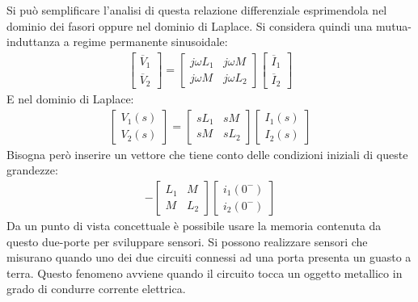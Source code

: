 \documentclass{article}
\numberwithin{equation}{subsection}
\begin{document}
Si può semplificare l'analisi di questa relazione differenziale esprimendola nel dominio dei fasori oppure nel dominio di Laplace. Si considera quindi una mutua-induttanza 
a regime permanente sinusoidale:
\begin{gather*}
    \begin{bmatrix}
        \overline{V}_1\\ \overline{V}_2
    \end{bmatrix}=\begin{bmatrix}
        j\omega L_1&j\omega M\\j\omega M&j\omega L_2
    \end{bmatrix}\begin{bmatrix}
        \overline{I}_1\\ \overline{I}_2
    \end{bmatrix}
\end{gather*}
E nel dominio di Laplace:
\begin{gather*}
    \begin{bmatrix}
        V_1(s)\\ V_2(s)
    \end{bmatrix}=\begin{bmatrix}
        s L_1&s M\\s M&s L_2
    \end{bmatrix}\begin{bmatrix}
        I_1(s)\\ I_2(s)
    \end{bmatrix}
\end{gather*}
Bisogna però inserire un vettore che tiene conto delle condizioni iniziali di queste grandezze:
\begin{gather*}
    -\begin{bmatrix}
        L_1&M\\M&L_2
    \end{bmatrix}\begin{bmatrix}
        i_1(0^-)\\i_2(0^-)
    \end{bmatrix}
\end{gather*}
Da un punto di vista concettuale è possibile usare la memoria contenuta da questo due-porte per sviluppare sensori. Si possono realizzare sensori che misurano quando uno dei 
due circuiti connessi ad una porta presenta un guasto a terra. Questo fenomeno avviene quando il circuito tocca un oggetto metallico in grado di condurre corrente elettrica. 
\end{document}
